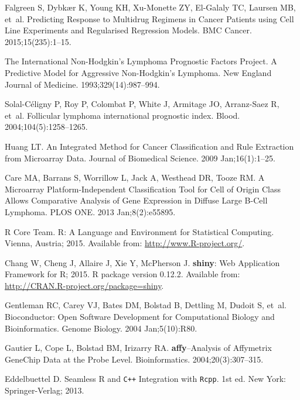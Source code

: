 \documentclass[10pt,letterpaper]{article}
\newcommand{\R}{\textsf{R}}
\newcommand{\pkg}[1]{\textbf{#1}}
\begin{document}
\begin{thebibliography}{10}
Falgreen S, Dybk{\ae}r K, Young KH, Xu-Monette ZY, El-Galaly TC, Laursen MB,
  et~al.
\newblock Predicting Response to Multidrug Regimens in Cancer Patients using
  Cell Line Experiments and Regularised Regression Models.
\newblock BMC Cancer. 2015;15(235):1--15.

{The International Non-Hodgkin's Lymphoma Prognostic Factors Project}.
\newblock A Predictive Model for Aggressive Non-Hodgkin's Lymphoma.
\newblock New England Journal of Medicine. 1993;329(14):987--994.

Solal-C{\'e}ligny P, Roy P, Colombat P, White J, Armitage JO, Arranz-Saez R,
  et~al.
\newblock Follicular lymphoma international prognostic index.
\newblock Blood. 2004;104(5):1258--1265.

Huang LT.
\newblock An Integrated Method for Cancer Classification and Rule Extraction
  from Microarray Data.
\newblock Journal of Biomedical Science. 2009 Jan;16(1):1--25.

Care MA, Barrans S, Worrillow L, Jack A, Westhead DR, Tooze RM.
\newblock A Microarray Platform-Independent Classification Tool for Cell of
  Origin Class Allows Comparative Analysis of Gene Expression in Diffuse Large
  {B}-Cell Lymphoma.
\newblock PLOS ONE. 2013 Jan;8(2):e55895.

{\R{} Core Team}. {\R}: A Language and Environment for Statistical Computing.
\newblock Vienna, Austria; 2015.
\newblock Available from: \url{http://www.R-project.org/}.

Chang W, Cheng J, Allaire J, Xie Y, McPherson J. \pkg{shiny}: Web Application
  Framework for R; 2015.
\newblock \R{} package version 0.12.2.
\newblock Available from: \url{http://CRAN.R-project.org/package=shiny}.

Gentleman RC, Carey VJ, Bates DM, Bolstad B, Dettling M, Dudoit S, et~al.
\newblock Bioconductor: Open Software Development for Computational Biology and
  Bioinformatics.
\newblock Genome Biology. 2004 Jan;5(10):R80.

Gautier L, Cope L, Bolstad BM, Irizarry RA.
\newblock \pkg{affy}--Analysis of Affymetrix GeneChip Data at the Probe Level.
\newblock Bioinformatics. 2004;20(3):307--315.

Eddelbuettel D.
\newblock Seamless {\R} and \texttt{C++} Integration with \texttt{Rcpp}.
\newblock 1st ed. New York: {Springer-Verlag}; 2013.


\end{thebibliography}
\end{document}
